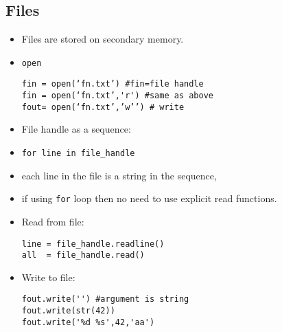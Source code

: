 \documentclass[onecolumn]{IEEEtran} %
\begin{document}
\subsection{Files}
\begin{itemize}
    \item Files are stored on secondary memory.
    \item \verb|open|
    \begin{verbatim}
fin = open(‘fn.txt’) #fin=file handle
fin = open(‘fn.txt’,'r') #same as above
fout= open(‘fn.txt’,’w’’) # write
    \end{verbatim}
    \item File handle as a sequence: \newline
    \bi
        \item \verb|for line in file_handle|
        \item each line in the file is a string in the sequence,
        \item if using \verb|for| loop then no need to use explicit read functions.
    \ei
    \item Read from file:
    \begin{verbatim}
line = file_handle.readline()
all  = file_handle.read()
  \end{verbatim}
  \item Write to file:
  \begin{verbatim}
fout.write('') #argument is string
fout.write(str(42))
fout.write('%d %s',42,'aa')
  \end{verbatim}
\end{itemize}
\end{document}
